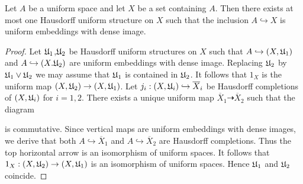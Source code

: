 \documentclass[10pt]{amsart}
\begin{document}
\begin{proposition}\label{proposition:Hausdorff_uniform_structure_is_determined_by_dense_subspace}
	Let $A$ be a uniform space and let $X$ be a set containing $A$. Then there exists at most one Hausdorff uniform structure on $X$ such that the inclusion $A\hookrightarrow X$ is uniform embeddings with dense image.
\end{proposition}
\begin{proof}
	Let ${\mathfrak U}_1$,${\mathfrak U}_2$ be Hausdorff uniform structures on $X$ such that $A\hookrightarrow (X,{\mathfrak U}_1)$ and $A \hookrightarrow (X.{\mathfrak U}_2)$ are uniform embeddings with dense image. Replacing ${\mathfrak U}_2$ by ${\mathfrak U}_1\vee {\mathfrak U}_2$ we may assume that ${\mathfrak U}_1$ is contained in ${\mathfrak U}_2$. It follows that $1_X$ is the uniform map $(X,{\mathfrak U}_2)\rightarrow (X,{\mathfrak U}_1)$. Let $j_i:(X,{\mathfrak U}_i)\hookrightarrow \overline{X}_i$ be Hausdorff completions of $(X,{\mathfrak U}_i)$ for $i=1,2$. There exists a unique uniform map $\overline{X}_1\dashrightarrow \overline{X}_2$ such that the diagram
	\begin{center}
	\end{center}
	is commutative. Since vertical maps are uniform embeddings with dense images, we derive that both $A\hookrightarrow \overline{X}_1$ and $A\hookrightarrow \overline{X}_2$ are Hausdorff completions. Thus the top horizontal arrow is an isomorphism of uniform spaces. It follows that $1_X:(X,{\mathfrak U}_2)\rightarrow (X,{\mathfrak U}_1)$ is an isomorphism of uniform spaces. Hence ${\mathfrak U}_1$ and ${\mathfrak U}_2$ coincide.
\end{proof}
\end{document}

